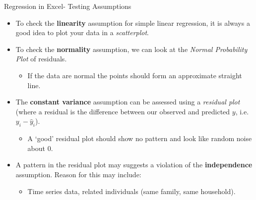 \documentclass[xcolor=svgnames]{beamer}
\begin{document}
\begin{frame}[label=current]{Regression in Excel- Testing Assumptions}
\begin{itemize}
\item To check the {\bf linearity} assumption for simple linear regression, it is always a good idea to plot your data in a \textit{scatterplot}.
\medskip
\item To check the {\bf normality} assumption, we can look at the \textit{Normal Probability Plot} of residuals. 
\begin{itemize}
\item If the data are normal the points should form an approximate straight line. 
\end{itemize}

\medskip
\item The {\bf constant variance} assumption can be assessed using a \textit{residual plot} (where a residual  is the difference between our observed and predicted $y$, i.e. $y_i - \hat y_i$).
\begin{itemize}
\item A `good' residual plot should show no pattern and look like random noise about 0.
\end{itemize}
\medskip
\item A pattern in the residual plot may suggests a violation of the {\bf independence} assumption.  Reason for this may include:
\begin{itemize}
\item Time series data,  related individuals (same family, same household).
\end{itemize}


\medskip
\end{itemize}
\end{frame}
\end{document}
